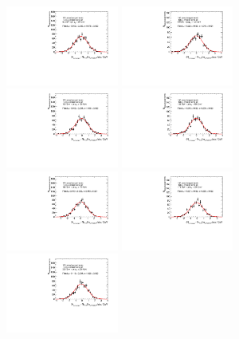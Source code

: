 \begin{figure}
\includegraphics[width=0.33\textwidth]{fig/UnfoldPull/SingleSlicePull8.pdf}
\includegraphics[width=0.33\textwidth]{fig/UnfoldPull/SingleSlicePull9.pdf}
%
\includegraphics[width=0.33\textwidth]{fig/UnfoldPull/SingleSlicePull10.pdf}
\includegraphics[width=0.33\textwidth]{fig/UnfoldPull/SingleSlicePull11.pdf}
\includegraphics[width=0.33\textwidth]{fig/UnfoldPull/SingleSlicePull12.pdf}
%
\includegraphics[width=0.33\textwidth]{fig/UnfoldPull/SingleSlicePull13.pdf}
\includegraphics[width=0.33\textwidth]{fig/UnfoldPull/SingleSlicePull14.pdf}

\end{figure}
